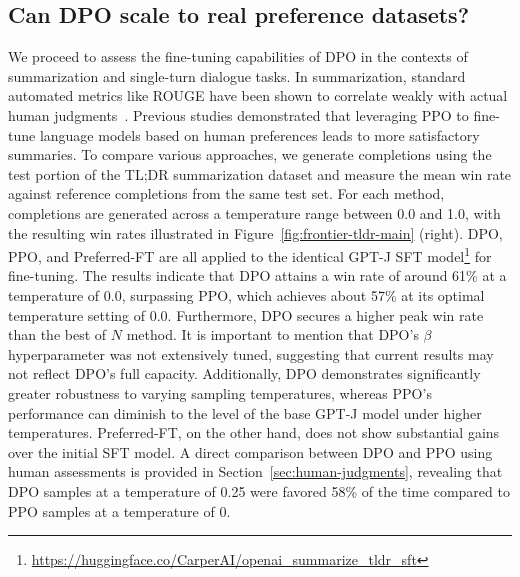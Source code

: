 \subsection{Can DPO scale to real preference datasets?}
\label{sec:dpo-real-datasets}
We proceed to assess the fine-tuning capabilities of DPO in the contexts of summarization and single-turn dialogue tasks. In summarization, standard automated metrics like ROUGE have been shown to correlate weakly with actual human judgments~\citep{stiennon2022learning}. Previous studies demonstrated that leveraging PPO to fine-tune language models based on human preferences leads to more satisfactory summaries. To compare various approaches, we generate completions using the test portion of the TL;DR summarization dataset and measure the mean win rate against reference completions from the same test set. For each method, completions are generated across a temperature range between 0.0 and 1.0, with the resulting win rates illustrated in Figure~\ref{fig:frontier-tldr-main} (right). DPO, PPO, and Preferred-FT are all applied to the identical GPT-J SFT model\footnote{\url{https://huggingface.co/CarperAI/openai_summarize_tldr_sft}} for fine-tuning. The results indicate that DPO attains a win rate of around 61\% at a temperature of 0.0, surpassing PPO, which achieves about 57\% at its optimal temperature setting of 0.0. Furthermore, DPO secures a higher peak win rate than the best of $N$ method. It is important to mention that DPO’s $\beta$ hyperparameter was not extensively tuned, suggesting that current results may not reflect DPO’s full capacity. Additionally, DPO demonstrates significantly greater robustness to varying sampling temperatures, whereas PPO’s performance can diminish to the level of the base GPT-J model under higher temperatures. Preferred-FT, on the other hand, does not show substantial gains over the initial SFT model. A direct comparison between DPO and PPO using human assessments is provided in Section~\ref{sec:human-judgments}, revealing that DPO samples at a temperature of 0.25 were favored 58\% of the time compared to PPO samples at a temperature of 0.

